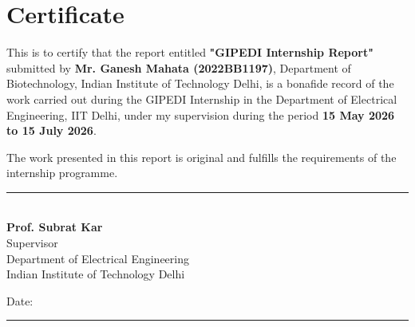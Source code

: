 

\chapter*{ \Centering Certificate}
\thispagestyle{empty}

This is to certify that the report entitled
\textbf{"GIPEDI Internship Report"} submitted by
\textbf{Mr. Ganesh Mahata (2022BB1197)},
Department of Biotechnology, Indian Institute of Technology Delhi,
is a bonafide record of the work carried out during the GIPEDI Internship
in the Department of Electrical Engineering, IIT Delhi,
under my supervision during the period
\textbf{15 May 2026 to 15 July 2026}.

The work presented in this report is original and fulfills the requirements
of the internship programme.

\vspace{3cm}
\begin{flushright}
\rule{6cm}{0.4pt}\\[0.2cm]
\textbf {Prof. Subrat Kar}\\
Supervisor\\
Department of Electrical Engineering\\
Indian Institute of Technology Delhi
\end{flushright}

\vfill

\noindent
Date: \rule{4cm}{0.4pt}

\clearpage